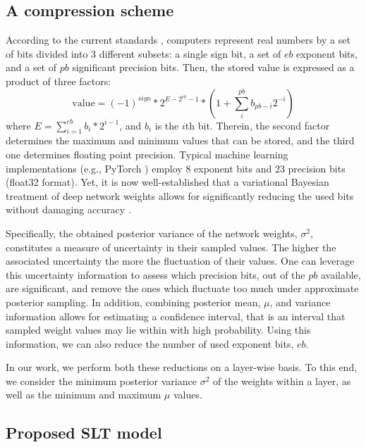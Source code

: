 \documentclass[10pt,twocolumn,letterpaper]{article}
\begin{document}
\subsection{A compression scheme}

According to the current standards \cite{sites2008ieee}, computers represent real numbers by a set of bits divided into 3 different subsets:  a single sign bit, a set of $eb$ exponent bits, and a set of $pb$ significant precision bits. Then, the stored value is expressed as a product of three factors:
\begin{equation}
    \mathrm{value} = (-1)^{sign} * 2^{E-2^{eb}-1} * (1+\sum_{i}^{pb}{b_{pb-i}2^{-i}}  )
\end{equation} where $ E= \sum_{i=1}^{eb}{b_i*2^{i-1}} $, and $b_i$ is the $i$th bit. Therein, the second factor determines the maximum and minimum values that can be stored, and the third one determines floating point precision. Typical machine learning implementations (e.g., PyTorch \cite{NEURIPS2019_9015}) employ 8 exponent bits and 23 precision bits (float32 format). Yet, it is now well-established that a variational Bayesian treatment of deep network weights allows for significantly reducing the used bits without damaging  accuracy \cite{panousis2019nonparametric, elan2020}. 

Specifically, the obtained posterior variance of the network weights, $\sigma^2$, constitutes a measure of uncertainty in their sampled values. The higher the associated uncertainty the more the fluctuation of their values. One can leverage this uncertainty information to assess which precision bits, out of the $pb$ available, are significant, and remove the ones which fluctuate too much under approximate posterior sampling. In addition, combining posterior mean, $\mu$, and variance information allows for estimating a confidence interval, that is an interval that sampled weight values may lie within with high probability. Using this information, we can also reduce the number of used exponent bits, $eb$. 

In our work, we perform both these reductions on a layer-wise basis. To this end, we consider the minimum posterior variance $\sigma^2$ of the weights within a layer, as well as the minimum and maximum $\mu$ values. 


\subsection{Proposed SLT model}
\end{document}
